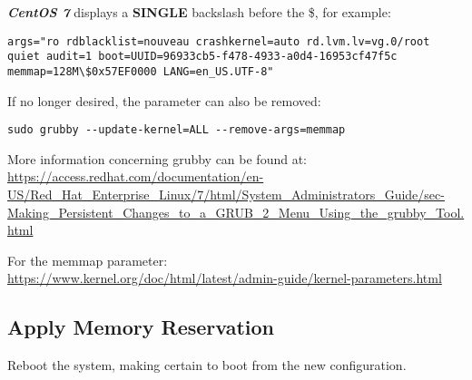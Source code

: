 \begin{flushleft}
\textbf{\textit{CentOS 7}} displays a \textbf{SINGLE} backslash before the \$, for example: \\
\begin{lstlisting}
args="ro rdblacklist=nouveau crashkernel=auto rd.lvm.lv=vg.0/root quiet audit=1 boot=UUID=96933cb5-f478-4933-a0d4-16953cf47f5c memmap=128M\$0x57EF0000 LANG=en_US.UTF-8"
\end{lstlisting}

If no longer desired, the parameter can also be removed:
\begin{lstlisting}
sudo grubby --update-kernel=ALL --remove-args=memmap
\end{lstlisting}

More information concerning grubby can be found at:\\
\url{https://access.redhat.com/documentation/en-US/Red_Hat_Enterprise_Linux/7/html/System_Administrators_Guide/sec-Making_Persistent_Changes_to_a_GRUB_2_Menu_Using_the_grubby_Tool.html}
\bigskip

For the memmap parameter:\\
\url{https://www.kernel.org/doc/html/latest/admin-guide/kernel-parameters.html}

\subsection{Apply Memory Reservation}
Reboot the system, making certain to boot from the new configuration.

\end{flushleft}
